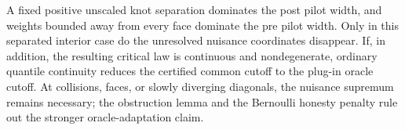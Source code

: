 A fixed positive unscaled knot separation dominates the post pilot width, and weights bounded away from every face dominate the pre pilot width.  Only in this separated interior case do the unresolved nuisance coordinates disappear.  If, in addition, the resulting critical law is continuous and nondegenerate, ordinary quantile continuity reduces the certified common cutoff to the plug-in oracle cutoff.  At collisions, faces, or slowly diverging diagonals, the nuisance supremum remains necessary; the obstruction lemma and the Bernoulli honesty penalty rule out the stronger oracle-adaptation claim.
